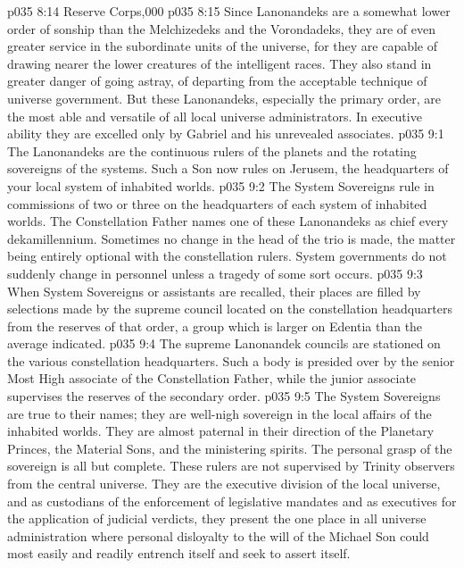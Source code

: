 \vs p035 8:14 Reserve Corps,000
\vs p035 8:15 \pc Since Lanonandeks are a somewhat lower order of sonship than the Melchizedeks and the Vorondadeks, they are of even greater service in the subordinate units of the universe, for they are capable of drawing nearer the lower creatures of the intelligent races. They also stand in greater danger of going astray, of departing from the acceptable technique of universe government. But these Lanonandeks, especially the primary order, are the most able and versatile of all local universe administrators. In executive ability they are excelled only by Gabriel and his unrevealed associates.
\vs p035 9:1 The Lanonandeks are the continuous rulers of the planets and the rotating sovereigns of the systems. Such a Son now rules on Jerusem, the headquarters of your local system of inhabited worlds.
\vs p035 9:2 The System Sovereigns rule in commissions of two or three on the headquarters of each system of inhabited worlds. The Constellation Father names one of these Lanonandeks as chief every dekamillennium. Sometimes no change in the head of the trio is made, the matter being entirely optional with the constellation rulers. System governments do not suddenly change in personnel unless a tragedy of some sort occurs.
\vs p035 9:3 When System Sovereigns or assistants are recalled, their places are filled by selections made by the supreme council located on the constellation headquarters from the reserves of that order, a group which is larger on Edentia than the average indicated.
\vs p035 9:4 The supreme Lanonandek councils are stationed on the various constellation headquarters. Such a body is presided over by the senior Most High associate of the Constellation Father, while the junior associate supervises the reserves of the secondary order.
\vs p035 9:5 \pc The System Sovereigns are true to their names; they are well\hyp{}nigh sovereign in the local affairs of the inhabited worlds. They are almost paternal in their direction of the Planetary Princes, the Material Sons, and the ministering spirits. The personal grasp of the sovereign is all but complete. These rulers are not supervised by Trinity observers from the central universe. They are the executive division of the local universe, and as custodians of the enforcement of legislative mandates and as executives for the application of judicial verdicts, they present the one place in all universe administration where personal disloyalty to the will of the Michael Son could most easily and readily entrench itself and seek to assert itself.
